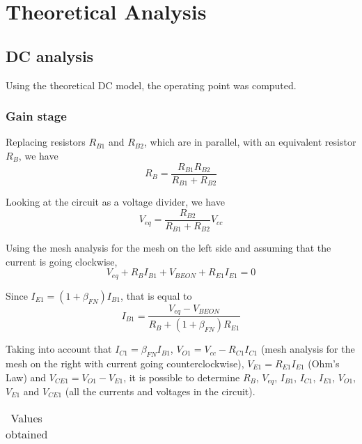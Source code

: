 \section{Theoretical Analysis}
\label{sec:analysis}




\subsection{DC analysis}
Using the theoretical DC model, the operating point was computed.


\subsubsection{Gain stage}
Replacing resistors $R_{B1}$ and $R_{B2}$, which are in parallel, with an equivalent resistor $R_{B}$, we have
\begin{equation}
R_B = \frac{R_{B1} R_{B2}}{R_{B1}+R_{B2}}
\end{equation}

Looking at the circuit as a voltage divider, we have
\begin{equation}
V_{eq} = \frac{R_{B2}}{R_{B1}+R_{B2}} V_{cc}
\end{equation}

Using the mesh analysis for the mesh on the left side and assuming that the current is going clockwise,
\begin{equation}
V_{eq} + R_B I_{B1} + V_{BEON} + R_{E1} I_{E1} = 0
\end{equation}

Since $I_{E1} = (1 + \beta_{FN}) I_{B1}$, that is equal to 
\begin{equation}
I_{B1} = \frac{V_{eq}-V_{BEON}}{R_B + (1+\beta_{FN}) R_{E1}}
\end{equation}

Taking into account that $I_{C1} = \beta_{FN} I_{B1}$, $V_{O1} = V_{cc} - R_{C1} I_{C1}$ (mesh analysis for the mesh on the right with current going counterclockwise), $V_{E1} = R_{E1} I_{E1}$ (Ohm's Law) and $V_{CE1} = V_{O1} - V_{E1}$, it is possible to determine $R_B$, $V_{eq}$, $I_{B1}$, $I_{C1}$, $I_{E1}$, $V_{O1}$, $V_{E1}$ and $V_{CE1}$ (all the currents and voltages in the circuit).


\begin{table}[H]
  \centering
  \begin{tabular}{|c|c|}
    \hline
      
  \end{tabular}
  \caption{Values obtained}
  \label{tab:resultsDC1}
\end{table}



